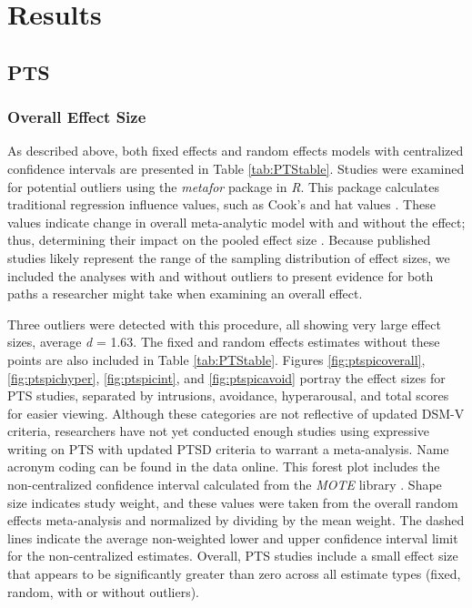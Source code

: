 \documentclass[english,man]{apa6}
\theoremstyle{definition}
\theoremstyle{definition}
\theoremstyle{definition}
\theoremstyle{remark}
\begin{document}
\section{Results}\label{results}

\subsection{PTS}\label{pts}

\subsubsection{Overall Effect Size}\label{overall-effect-size}

As described above, both fixed effects and random effects models with
centralized confidence intervals are presented in Table
\ref{tab:PTStable}. Studies were examined for potential outliers using
the \emph{metafor} package in \emph{R}. This package calculates
traditional regression influence values, such as Cook's and hat values
\autocite{Cohen1988}. These values indicate change in overall
meta-analytic model with and without the effect; thus, determining their
impact on the pooled effect size \autocite{Viechtbauer2010}. Because
published studies likely represent the range of the sampling
distribution of effect sizes, we included the analyses with and without
outliers to present evidence for both paths a researcher might take when
examining an overall effect.

Three outliers were detected with this procedure, all showing very large
effect sizes, average \emph{d} = 1.63. The fixed and random effects
estimates without these points are also included in Table
\ref{tab:PTStable}. Figures \ref{fig:ptspicoverall},
\ref{fig:ptspichyper}, \ref{fig:ptspicint}, and \ref{fig:ptspicavoid}
portray the effect sizes for PTS studies, separated by intrusions,
avoidance, hyperarousal, and total scores for easier viewing. Although
these categories are not reflective of updated DSM-V criteria,
researchers have not yet conducted enough studies using expressive
writing on PTS with updated PTSD criteria to warrant a meta-analysis.
Name acronym coding can be found in the data online. This forest plot
includes the non-centralized confidence interval calculated from the
\emph{MOTE} library \autocite{Buchanan2017}. Shape size indicates study
weight, and these values were taken from the overall random effects
meta-analysis and normalized by dividing by the mean weight. The dashed
lines indicate the average non-weighted lower and upper confidence
interval limit for the non-centralized estimates. Overall, PTS studies
include a small effect size that appears to be significantly greater
than zero across all estimate types (fixed, random, with or without
outliers).
\end{document}
